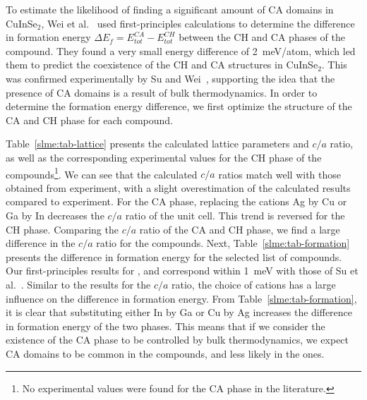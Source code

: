 \begin{refsection}
To estimate the likelihood of finding a significant amount of \gls{CA} domains in 
CuInSe$_2$, Wei et al.~\cite{Wei1999} used first-principles calculations to 
determine the difference in formation energy $\Delta E_f = E_{tot}^{CA} - 
E_{tot}^{CH}$ between the \gls{CH} and \gls{CA} phases of the compound. They found a very 
small energy difference of 2~\si{\milli\electronvolt}/atom, which led them to 
predict the coexistence of the \gls{CH} and \gls{CA} structures in CuInSe$_2$. This was 
confirmed experimentally by Su and Wei~\cite{Su1999}, supporting the idea that 
the presence of \gls{CA} domains is a result of bulk thermodynamics. In order to 
determine the formation energy difference, we first optimize the structure of 
the \gls{CA} and \gls{CH} phase for each compound. 
 
Table~\ref{slme:tab-lattice} presents the calculated lattice parameters and 
$c/a$ ratio, as well as the corresponding experimental values 
for the \gls{CH} phase of the compounds\footnote[3]{No experimental values were 
found for the \gls{CA} phase in the literature.}. We can see that the calculated 
$c/a$ ratios match well with those obtained from experiment, with a slight overestimation of the calculated results compared to experiment. For the \gls{CA} phase, 
replacing the cations Ag by Cu or Ga by In decreases the $c/a$ ratio of the 
unit cell. This trend is reversed for the \gls{CH} phase. Comparing the $c/a$ 
ratio of the \gls{CA} and \gls{CH} phase, we find a large difference in the $c/a$ ratio 
for the \mbox{} compounds. Next, Table~\ref{slme:tab-formation} 
presents the difference in formation energy for the selected list of 
compounds. Our first-principles results for ,  and 
 correspond within 1~\si{\milli\electronvolt} with those of Su et al.~\cite{Su1999}. Similar to 
the results for the $c/a$ ratio, the choice of cations has a large influence 
on the difference in formation energy. From Table~\ref{slme:tab-formation}, it is 
clear that substituting either In by Ga or Cu by Ag increases the difference 
in formation energy of the two phases. This means that if we consider the 
existence of the \gls{CA} phase to be controlled by bulk thermodynamics, we expect 
CA domains to be common in the \mbox{} compounds, and less likely 
in the \mbox{} ones.  


\end{refsection}
